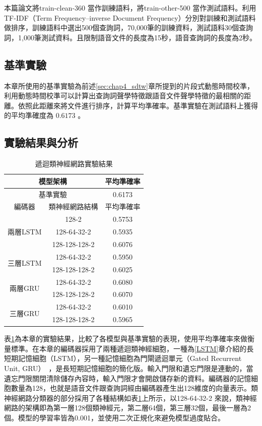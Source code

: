  本篇論文將train-clean-360 當作訓練語料，將train-other-500
 當作測試語料。利用TF-IDF（Term Frequency–inverse Document
 Frequency）分別對訓練和測試語料做排序，訓練語料中選出500個查詢詞，70,000筆的訓練資料，測試語料30個查詢詞，1,000筆測試資料。且限制語音文件的長度為15秒，語音查詢詞的長度為2秒。
\subsection{基準實驗}
本章所使用的基準實驗為前述\ref{sec:chap4_sdtw}章所提到的片段式動態時間校準，利用動態時間校準可以計算出查詢詞聲學特徵跟語音文件聲學特徵的最相關的距離。依照此距離來將文件進行排序，計算平均準確率。基準實驗在測試語料上獲得的平均準確度為 $ 0.6173 $ 。
\subsection{實驗結果與分析}
 \begin{table}[ht]
	 \centering
	 \caption{遞迴類神經網路實驗結果}

	 \label{table:ch3_exp}
	 \begin{tabular}{|c|c|c|}
		 \hline
		 \multicolumn{2}{|c|}{模型架構} & 平均準確率 \\
		 \hline
		 \multicolumn{2}{|c|}{基準實驗} & 0.6173 \\
		 \hline
		 \hline 
		 編碼器 & 類神經網路結構 & 平均準確率  \\
		 \hline
		 \multirow{3}{*}{兩層LSTM} & 128-2 & 0.5753\\
		 \cline{2-3}
		 & 128-64-32-2 & 0.5935 \\
		 \cline{2-3}
		 & 128-128-128-2 & 0.6076\\
		 \hline
		 \multirow{2}{*}{三層LSTM} & 128-64-32-2 & 0.5950 \\
		 \cline{2-3}
		 & 128-128-128-2 & 0.6025 \\
		 \hline
		 \multirow{2}{*}{兩層GRU} & 128-64-32-2  &  0.6080\\
		 \cline{2-3}
		 & 128-128-128-2 & 0.6070 \\
		 \hline
		 \multirow{2}{*}{三層GRU} & 128-64-32-2  & 0.6010 \\
		 \cline{2-3}
		 & 128-128-128-2 & 0.5965 \\
		 \hline
	   \end{tabular}
 \end{table}

表\ref{table:ch3_exp}為本章的實驗結果，比較了各模型與基準實驗的表現，使用平均準確率來做衡量標準。在本章的編碼器採用了兩種遞迴類神經細胞，一種為\ref{LSTM}章介紹的長短期記憶細胞（LSTM），另一種記憶細胞為門閘遞迴單元（Gated
Recurrent Unit,
GRU）~\cite{cho2014learning}，是長短期記憶細胞的簡化版。輸入門限和遺忘門限是連動的，當遺忘門限關閉清除儲存內容時，輸入門限才會開啟儲存新的資料。編碼器的記憶細胞數量為128，也就是語音文件跟查詢詞經由編碼器產生出128維度的向量表示。類神經網路分類器的部分採用了各種結構如表\ref{table:ch3_exp}上所示，以128-64-32-2
來說，類神經網路的架構即為第一層128個類神經元，第二層64個，第三層32個，最後一層為2個。模型的學習率皆為0.001，並使用二次正規化來避免模型過度貼合。

